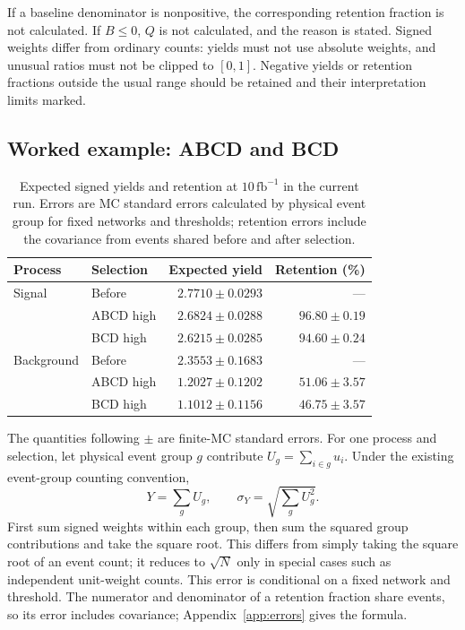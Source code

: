 \documentclass[11pt,a4paper]{article}
\begin{document}
If a baseline denominator is nonpositive, the corresponding retention fraction is not calculated.
If $B\leq0$, $Q$ is not calculated, and the reason is stated.
Signed weights differ from ordinary counts: yields must not use absolute weights, and unusual ratios must not be clipped to $[0,1]$.
Negative yields or retention fractions outside the usual range should be retained and their interpretation limits marked.

\subsection{Worked example: ABCD and BCD}
\begin{table}[H]
\caption{Expected signed yields and retention at $10\,\mathrm{fb}^{-1}$ in the current run. Errors are MC standard errors calculated by physical event group for fixed networks and thresholds; retention errors include the covariance from events shared before and after selection.}
\label{tab:yields}
\centering
\begin{tabular}{llrr}
\toprule
Process & Selection & Expected yield & Retention (\%) \\
\midrule
Signal & Before & $2.7710\pm0.0293$ & --- \\
 & ABCD high & $2.6824\pm0.0288$ & $96.80\pm0.19$ \\
 & BCD high & $2.6215\pm0.0285$ & $94.60\pm0.24$ \\
Background & Before & $2.3553\pm0.1683$ & --- \\
 & ABCD high & $1.2027\pm0.1202$ & $51.06\pm3.57$ \\
 & BCD high & $1.1012\pm0.1156$ & $46.75\pm3.57$ \\
\bottomrule
\end{tabular}
\end{table}
The quantities following $\pm$ are finite-MC standard errors.
For one process and selection, let physical event group $g$ contribute $U_g=\sum_{i\in g}u_i$.
Under the existing event-group counting convention,
\[
 Y=\sum_g U_g,\qquad \sigma_Y=\sqrt{\sum_g U_g^2}.
\]
First sum signed weights within each group, then sum the squared group contributions and take the square root.
This differs from simply taking the square root of an event count; it reduces to $\sqrt{N}$ only in special cases such as independent unit-weight counts.
This error is conditional on a fixed network and threshold.
The numerator and denominator of a retention fraction share events, so its error includes covariance; Appendix~\ref{app:errors} gives the formula.
\end{document}
